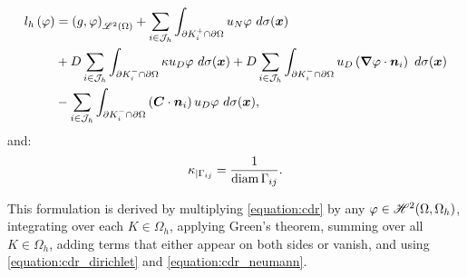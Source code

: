 \begin{align}
    l_h \left( \varphi \right)  &= \left( g, \varphi \right)_{\mathscr{L}^{2}(\Omega)} + \sum_{i \in \mathcal{J}_h} \int_{\partial K_i^+ \cap \partial \Omega} u_N \varphi ~ d \sigma(\bm{x}) \label{equation:cdr_lh} \\
    &+ D \sum_{i \in \mathcal{J}_h} \int_{\partial K_i^- \cap \partial \Omega} \kappa u_D \varphi ~ d \sigma(\bm{x}) + D \sum_{i \in \mathcal{J}_h} \int_{\partial K_i^- \cap \partial \Omega} u_D \left( \bm{\nabla} \varphi \cdot \bm{n}_i \right) ~ d \sigma(\bm{x}) \notag \\
    &- \sum_{i \in \mathcal{J}_h} \int_{\partial K_i^- \cap \partial \Omega} \left( \bm{C} \cdot \bm{n}_i \right) u_D \varphi ~ d \sigma(\bm{x}) \notag,
\end{align}
and:
\begin{gather}
    \kappa_{\mid \Gamma_{ij}} = \frac{1}{\operatorname*{diam} \Gamma_{ij}}.
\end{gather}

This formulation is derived by multiplying \eqref{equation:cdr} by any $\varphi \in \mathscr{H}^{2}(\Omega, \Omega_h)$, integrating over each $K \in \Omega_h$, applying Green's theorem, summing over all $K \in \Omega_h$, adding terms that either appear on both sides or vanish, and using \eqref{equation:cdr_dirichlet} and \eqref{equation:cdr_neumann}. %


